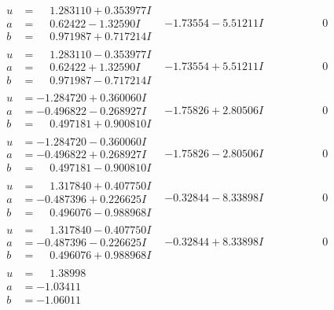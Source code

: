 \documentclass[1p]{elsarticle_modified}
\theoremstyle{definition}
\begin{document}
$$\begin{array}{c|c|c}
\begin{aligned}
u &= \phantom{-}1.283110 + 0.353977 I \\
a &= \phantom{-}0.62422 - 1.32590 I \\
b &= \phantom{-}0.971987 + 0.717214 I\end{aligned}
 & -1.73554 - 5.51211 I & \phantom{-0.000000 } 0 \\ \hline\begin{aligned}
u &= \phantom{-}1.283110 - 0.353977 I \\
a &= \phantom{-}0.62422 + 1.32590 I \\
b &= \phantom{-}0.971987 - 0.717214 I\end{aligned}
 & -1.73554 + 5.51211 I & \phantom{-0.000000 } 0 \\ \hline\begin{aligned}
u &= -1.284720 + 0.360060 I \\
a &= -0.496822 - 0.268927 I \\
b &= \phantom{-}0.497181 + 0.900810 I\end{aligned}
 & -1.75826 + 2.80506 I & \phantom{-0.000000 } 0 \\ \hline\begin{aligned}
u &= -1.284720 - 0.360060 I \\
a &= -0.496822 + 0.268927 I \\
b &= \phantom{-}0.497181 - 0.900810 I\end{aligned}
 & -1.75826 - 2.80506 I & \phantom{-0.000000 } 0 \\ \hline\begin{aligned}
u &= \phantom{-}1.317840 + 0.407750 I \\
a &= -0.487396 + 0.226625 I \\
b &= \phantom{-}0.496076 - 0.988968 I\end{aligned}
 & -0.32844 - 8.33898 I & \phantom{-0.000000 } 0 \\ \hline\begin{aligned}
u &= \phantom{-}1.317840 - 0.407750 I \\
a &= -0.487396 - 0.226625 I \\
b &= \phantom{-}0.496076 + 0.988968 I\end{aligned}
 & -0.32844 + 8.33898 I & \phantom{-0.000000 } 0 \\ \hline\begin{aligned}
u &= \phantom{-}1.38998\phantom{ +0.000000I} \\
a &= -1.03411\phantom{ +0.000000I} \\
b &= -1.06011\phantom{ +0.000000I}\end{aligned}

\end{array}$$
\end{document}
